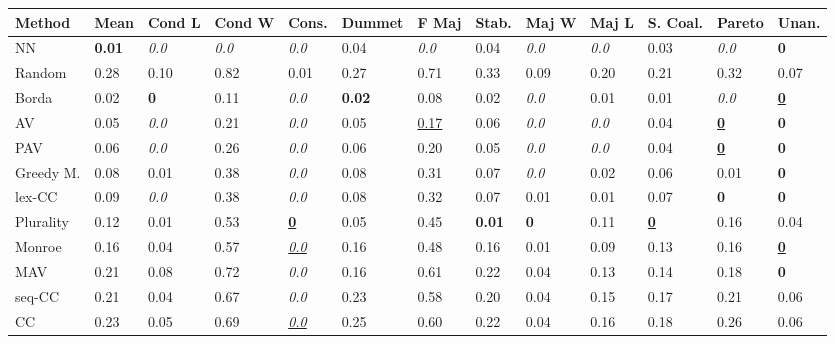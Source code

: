 \begin{tabular}{lllllllllllll}
\toprule
Method & Mean & Cond L & Cond W & Cons. & Dummet & F Maj & Stab. & Maj W & Maj L & S. Coal. & Pareto & Unan. \\
\midrule
NN & \textbf{0.01} & \textit{0.0} & \textit{0.0} & \textit{0.0} & 0.04 & \textit{0.0} & 0.04 & \textit{0.0} & \textit{0.0} & 0.03 & \textit{0.0} & \textbf{0} \\
Random & 0.28 & 0.10 & 0.82 & 0.01 & 0.27 & 0.71 & 0.33 & 0.09 & 0.20 & 0.21 & 0.32 & 0.07 \\
Borda & 0.02 & \textbf{0} & 0.11 & \textit{0.0} & \textbf{0.02} & 0.08 & 0.02 & \textit{0.0} & 0.01 & 0.01 & \textit{0.0} & \underline{\textbf{0}} \\
AV & 0.05 & \textit{0.0} & 0.21 & \textit{0.0} & 0.05 & \underline{0.17} & 0.06 & \textit{0.0} & \textit{0.0} & 0.04 & \underline{\textbf{0}} & \textbf{0} \\
PAV & 0.06 & \textit{0.0} & 0.26 & \textit{0.0} & 0.06 & 0.20 & 0.05 & \textit{0.0} & \textit{0.0} & 0.04 & \underline{\textbf{0}} & \textbf{0} \\
Greedy M. & 0.08 & 0.01 & 0.38 & \textit{0.0} & 0.08 & 0.31 & 0.07 & \textit{0.0} & 0.02 & 0.06 & 0.01 & \textbf{0} \\
lex-CC & 0.09 & \textit{0.0} & 0.38 & \textit{0.0} & 0.08 & 0.32 & 0.07 & 0.01 & 0.01 & 0.07 & \textbf{0} & \textbf{0} \\
Plurality & 0.12 & 0.01 & 0.53 & \underline{\textbf{0}} & 0.05 & 0.45 & \textbf{0.01} & \textbf{0} & 0.11 & \underline{\textbf{0}} & 0.16 & 0.04 \\
Monroe & 0.16 & 0.04 & 0.57 & \underline{\textit{0.0}} & 0.16 & 0.48 & 0.16 & 0.01 & 0.09 & 0.13 & 0.16 & \underline{\textbf{0}} \\
MAV & 0.21 & 0.08 & 0.72 & \textit{0.0} & 0.16 & 0.61 & 0.22 & 0.04 & 0.13 & 0.14 & 0.18 & \textbf{0} \\
seq-CC & 0.21 & 0.04 & 0.67 & \textit{0.0} & 0.23 & 0.58 & 0.20 & 0.04 & 0.15 & 0.17 & 0.21 & 0.06 \\
CC & 0.23 & 0.05 & 0.69 & \underline{\textit{0.0}} & 0.25 & 0.60 & 0.22 & 0.04 & 0.16 & 0.18 & 0.26 & 0.06 \\
\bottomrule
\end{tabular}
